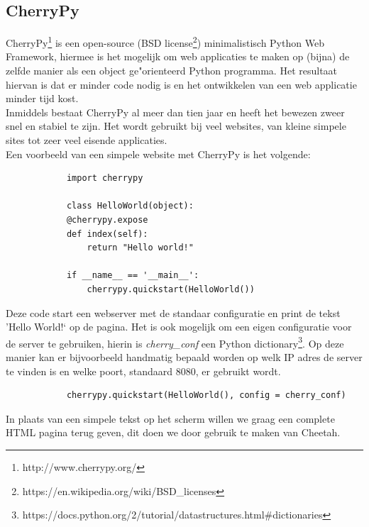 \documentclass[twoside,openright]{uva-bachelor-thesis}
\begin{document}
		\subsection{CherryPy}
			CherryPy\footnote{http://www.cherrypy.org/} is een open-source (BSD license\footnote{https://en.wikipedia.org/wiki/BSD\_licenses}) minimalistisch Python Web Framework, hiermee is het mogelijk om web applicaties te maken op (bijna) de zelfde manier als een object ge"orienteerd Python programma. Het resultaat hiervan is dat er minder code nodig is en het ontwikkelen van een web applicatie minder tijd kost.
			\\[0.5cm]
			Inmiddels bestaat CherryPy al meer dan tien jaar en heeft het bewezen zweer snel en stabiel te zijn. Het wordt gebruikt bij veel websites, van kleine simpele sites tot zeer veel eisende applicaties.
			\\[0.5cm]
			Een voorbeeld van een simpele website met CherryPy is het volgende:
			\begin{verbatim}
			import cherrypy
			
			class HelloWorld(object):
			@cherrypy.expose
			def index(self):
			    return "Hello world!"
			
			if __name__ == '__main__':
			    cherrypy.quickstart(HelloWorld())
			\end{verbatim}
			Deze code start een webserver met de standaar configuratie en print de tekst 'Hello World!` op de pagina. Het is ook mogelijk om een eigen configuratie voor de server te gebruiken, hierin is \textit{cherry\_conf} een Python dictionary\footnote{https://docs.python.org/2/tutorial/datastructures.html\#dictionaries}. Op deze manier kan er bijvoorbeeld handmatig bepaald worden op welk IP adres de server te vinden is en welke poort, standaard $8080$, er gebruikt wordt. 
			\begin{verbatim}
			cherrypy.quickstart(HelloWorld(), config = cherry_conf)
			\end{verbatim}
			In plaats van een simpele tekst op het scherm willen we graag een complete HTML pagina terug geven, dit doen we door gebruik te maken van Cheetah.
\end{document}
